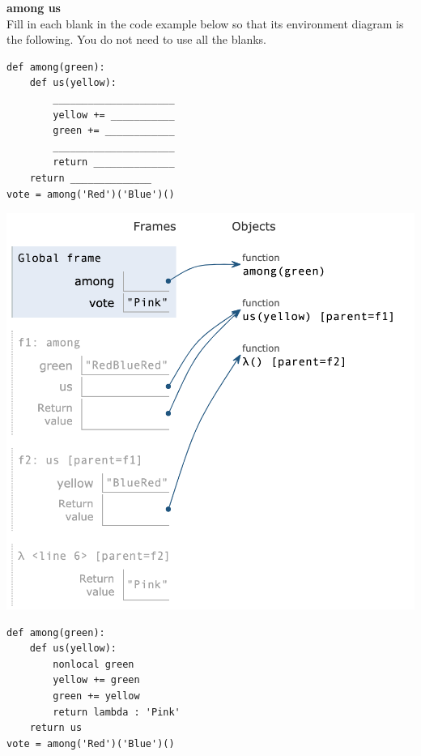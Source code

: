 \begin{blocksection}
\question
\textbf{among us}\\
Fill in each blank in the code example below so that its environment diagram is the following. You do not need to use all the blanks.

\begin{multicols}{2}
\begin{lstlisting}
def among(green):
    def us(yellow):
        _____________________
        yellow += ___________
        green += ____________
        _____________________
        return ______________
    return ______________
vote = among('Red')('Blue')()
\end{lstlisting}


\includegraphics[width=.5\textwidth]{amongus.png}
\end{multicols}

\begin{solution}[2in]
\begin{lstlisting}
def among(green):
    def us(yellow):
        nonlocal green
        yellow += green
        green += yellow
        return lambda : 'Pink'
    return us
vote = among('Red')('Blue')()
\end{lstlisting}
\end{solution}
\end{blocksection}


